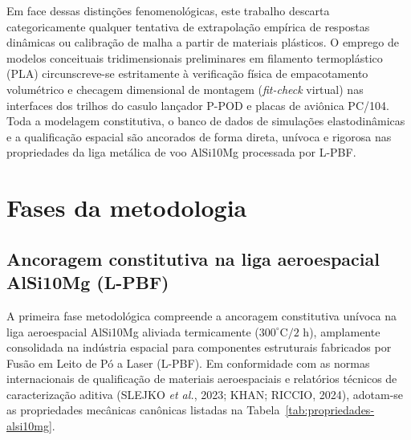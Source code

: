 Em face dessas distinções fenomenológicas, este trabalho descarta categoricamente qualquer tentativa de extrapolação empírica de respostas dinâmicas ou calibração de malha a partir de materiais plásticos. O emprego de modelos conceituais tridimensionais preliminares em filamento termoplástico (PLA) circunscreve-se estritamente à verificação física de empacotamento volumétrico e checagem dimensional de montagem (\textit{fit-check} virtual) nas interfaces dos trilhos do casulo lançador P-POD e placas de aviônica PC/104. Toda a modelagem constitutiva, o banco de dados de simulações elastodinâmicas e a qualificação espacial são ancorados de forma direta, unívoca e rigorosa nas propriedades da liga metálica de voo AlSi10Mg processada por L-PBF.

\section{Fases da metodologia}
\label{sec:fases}

\subsection{Ancoragem constitutiva na liga aeroespacial AlSi10Mg (L-PBF)}
\label{subsec:caracterizacao}

A primeira fase metodológica compreende a ancoragem constitutiva unívoca na liga aeroespacial AlSi10Mg aliviada termicamente ($300^\circ\text{C} / 2\text{ h}$), amplamente consolidada na indústria espacial para componentes estruturais fabricados por Fusão em Leito de Pó a Laser (L-PBF). Em conformidade com as normas internacionais de qualificação de materiais aeroespaciais e relatórios técnicos de caracterização aditiva (SLEJKO \textit{et al.}, 2023; KHAN; RICCIO, 2024), adotam-se as propriedades mecânicas canônicas listadas na Tabela~\ref{tab:propriedades-alsi10mg}.

